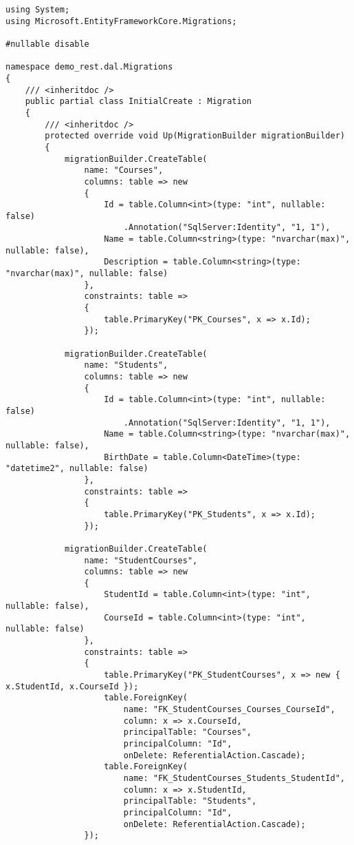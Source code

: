 \begin{lstlisting}
using System;
using Microsoft.EntityFrameworkCore.Migrations;

#nullable disable

namespace demo_rest.dal.Migrations
{
    /// <inheritdoc />
    public partial class InitialCreate : Migration
    {
        /// <inheritdoc />
        protected override void Up(MigrationBuilder migrationBuilder)
        {
            migrationBuilder.CreateTable(
                name: "Courses",
                columns: table => new
                {
                    Id = table.Column<int>(type: "int", nullable: false)
                        .Annotation("SqlServer:Identity", "1, 1"),
                    Name = table.Column<string>(type: "nvarchar(max)", nullable: false),
                    Description = table.Column<string>(type: "nvarchar(max)", nullable: false)
                },
                constraints: table =>
                {
                    table.PrimaryKey("PK_Courses", x => x.Id);
                });

            migrationBuilder.CreateTable(
                name: "Students",
                columns: table => new
                {
                    Id = table.Column<int>(type: "int", nullable: false)
                        .Annotation("SqlServer:Identity", "1, 1"),
                    Name = table.Column<string>(type: "nvarchar(max)", nullable: false),
                    BirthDate = table.Column<DateTime>(type: "datetime2", nullable: false)
                },
                constraints: table =>
                {
                    table.PrimaryKey("PK_Students", x => x.Id);
                });

            migrationBuilder.CreateTable(
                name: "StudentCourses",
                columns: table => new
                {
                    StudentId = table.Column<int>(type: "int", nullable: false),
                    CourseId = table.Column<int>(type: "int", nullable: false)
                },
                constraints: table =>
                {
                    table.PrimaryKey("PK_StudentCourses", x => new { x.StudentId, x.CourseId });
                    table.ForeignKey(
                        name: "FK_StudentCourses_Courses_CourseId",
                        column: x => x.CourseId,
                        principalTable: "Courses",
                        principalColumn: "Id",
                        onDelete: ReferentialAction.Cascade);
                    table.ForeignKey(
                        name: "FK_StudentCourses_Students_StudentId",
                        column: x => x.StudentId,
                        principalTable: "Students",
                        principalColumn: "Id",
                        onDelete: ReferentialAction.Cascade);
                });


\end{lstlisting}
